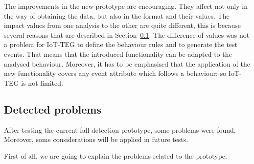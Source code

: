 \documentclass[review]{elsarticle}
\begin{document}
The improvements in the new prototype are encouraging. They affect not only in the way of obtaining the data, but 
also in the format and their values. The impact values from one analysis to the other are quite different, 
this is because several reasons that are described in Section~\ref{sub:detectedproblems}. The difference
of values was not a problem for IoT-TEG to define the behaviour rules and to generate the test events. That
means that the introduced functionality can be adapted to the analysed
behaviour. Moreover, it has to be emphasised that the application of the new functionality covers any event attribute which follows a behaviour;
so IoT-TEG is not limited.

\subsection{Detected problems}
\label{sub:detectedproblems}

After testing the current fall-detection prototype, some problems were 
found. Moreover, some considerations will be applied in future tests.

First of all, we are going to explain the problems related to the prototype: 
\end{document}

